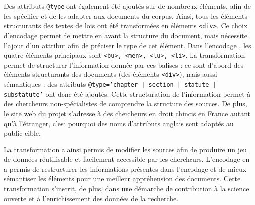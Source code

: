 Des attributs \texttt{@type} ont également été ajoutés sur de nombreux éléments, afin de les spécifier et de les adapter aux documents du corpus. Ainsi, tous les éléments structurants des textes de lois ont été transformées en éléments \TEI \texttt{<div>}. Ce choix d'encodage permet de mettre en avant la structure du document, mais nécessite l'ajout d'un attribut afin de préciser le type de cet élément. Dans l'encodage \LSC, les quatre éléments principaux sont \texttt{<bu>, <men>, <lu>, <li>}. La transformation \XSLT permet de structurer l'information donnée par ces balises : ce sont d'abord des éléments structurants des documents (des éléments \texttt{<div>}), mais aussi sémantiques : des attributs \texttt{@type='chapter | section | statute | substatute'} ont donc été ajoutés. Cette structuration de l'information permet à des chercheurs non-spécialistes de comprendre la structure des sources. De plus, le site web du projet \COREL s'adresse à des chercheurs en droit chinois en France autant qu'à l'étranger, c'est pourquoi des noms d'attributs anglais sont adaptés au public cible.

La transformation \XSLT a ainsi permis de modifier les sources \XML afin de produire un jeu de données réutilisable et facilement accessible par les chercheurs. L'encodage en \TEI a permis de restructurer les informations présentes dans l'encodage et de mieux sémantiser les éléments pour une meilleur appréhension des documents. Cette transformation s'inscrit, de plus, dans une démarche de contribution à la science ouverte et à l'enrichissement des données de la recherche.
